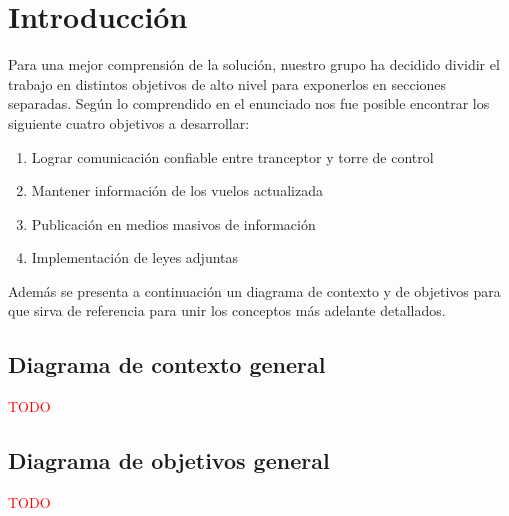 \section{Introducción}
Para una mejor comprensión de la solución, nuestro grupo ha decidido dividir el trabajo en distintos objetivos de alto nivel para exponerlos en secciones separadas. Según lo comprendido en el enunciado nos fue posible encontrar los siguiente cuatro objetivos a desarrollar:
\begin{enumerate}
  \item Lograr comunicación confiable entre tranceptor y torre de control
  \item Mantener información de los vuelos actualizada
  \item Publicación en medios masivos de información
  \item Implementación de leyes adjuntas
\end{enumerate}
Además se presenta a continuación un diagrama de contexto y de objetivos para que sirva de referencia para unir los conceptos más adelante detallados.

\subsection{Diagrama de contexto general}
\textcolor{red}{TODO}

\subsection{Diagrama de objetivos general}
\textcolor{red}{TODO}
